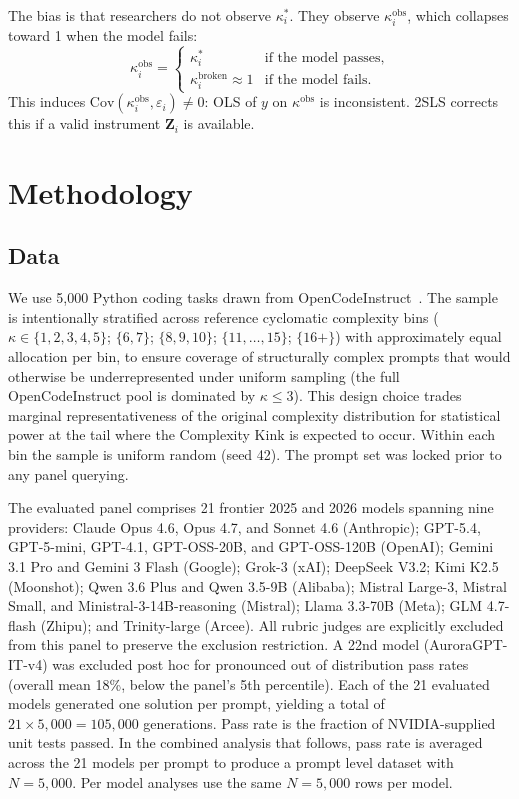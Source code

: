\documentclass{article}
\begin{document}
The bias is that researchers do not observe $\kappa_i^*$. They observe $\kappa_i^{\text{obs}}$, which collapses toward 1 when the model fails:
\begin{equation}
\kappa_i^{\text{obs}} =
\begin{cases}
\kappa_i^* & \text{if the model passes,}\\
\kappa_i^{\text{broken}}\approx 1 & \text{if the model fails.}
\end{cases}
\end{equation}
This induces $\mathrm{Cov}(\kappa_i^{\text{obs}},\varepsilon_i)\neq 0$: OLS of $y$ on $\kappa^{\text{obs}}$ is inconsistent. 2SLS corrects this if a valid instrument $\mathbf{Z}_i$ is available.

\section{Methodology}

\subsection{Data}
We use 5{,}000 Python coding tasks drawn from OpenCodeInstruct~\cite{opencodeinst}. The sample is intentionally stratified across reference cyclomatic complexity bins ($\kappa\in\{1,2,3,4,5\}$; $\{6,7\}$; $\{8,9,10\}$; $\{11,\ldots,15\}$; $\{16+\}$) with approximately equal allocation per bin, to ensure coverage of structurally complex prompts that would otherwise be underrepresented under uniform sampling (the full OpenCodeInstruct pool is dominated by $\kappa\leq 3$). This design choice trades marginal representativeness of the original complexity distribution for statistical power at the tail where the Complexity Kink is expected to occur. Within each bin the sample is uniform random (seed 42). The prompt set was locked prior to any panel querying.

The evaluated panel comprises 21 frontier 2025 and 2026 models spanning nine providers: Claude Opus 4.6, Opus 4.7, and Sonnet 4.6 (Anthropic); GPT-5.4, GPT-5-mini, GPT-4.1, GPT-OSS-20B, and GPT-OSS-120B (OpenAI); Gemini 3.1 Pro and Gemini 3 Flash (Google); Grok-3 (xAI); DeepSeek V3.2; Kimi K2.5 (Moonshot); Qwen 3.6 Plus and Qwen 3.5-9B (Alibaba); Mistral Large-3, Mistral Small, and Ministral-3-14B-reasoning (Mistral); Llama 3.3-70B (Meta); GLM 4.7-flash (Zhipu); and Trinity-large (Arcee). All rubric judges are explicitly excluded from this panel to preserve the exclusion restriction. A 22nd model (AuroraGPT-IT-v4) was excluded post hoc for pronounced out of distribution pass rates (overall mean 18\%, below the panel's 5th percentile). Each of the 21 evaluated models generated one solution per prompt, yielding a total of $21 \times 5{,}000 = 105{,}000$ generations. Pass rate is the fraction of NVIDIA-supplied unit tests passed. In the combined analysis that follows, pass rate is averaged across the 21 models per prompt to produce a prompt level dataset with $N=5{,}000$. Per model analyses use the same $N=5{,}000$ rows per model.
\end{document}

